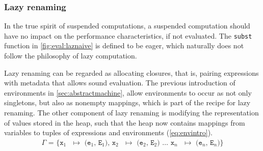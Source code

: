 

\subsubsection{Lazy renaming}
In the true spirit of suspended computations, a suspended computation should have no impact on the performance characteristics, if not evaluated.
The \texttt{subst} function in \autoref{fig:eval:laznaive} is defined to be eager, which naturally does not follow the philosophy of lazy computation.

Lazy renaming can be regarded as allocating closures, that is, pairing expressions with metadata that allows sound evaluation.
The previous introduction of environments in \autoref{sec:abstractmachine}, allow environments to occur as not only singletons, but also as nonempty mappings, which is part of the recipe for lazy renaming.
The other component of lazy renaming is modifying the representation of values stored in the heap, such that the heap now contains mappings from variables to tuples of expressions and environments (\autoref{eq:envintro}).
\begin{align}
	\texttt{$\Gamma$ = \{x$_1$ $\mapsto$ (e$_1$, E$_1$), x$_2$ $\mapsto$ (e$_2$, E$_2$) $\dots$ x$_n$ $\mapsto$ (e$_n$, E$_n$)\}}\label{eq:envintro}
\end{align}

